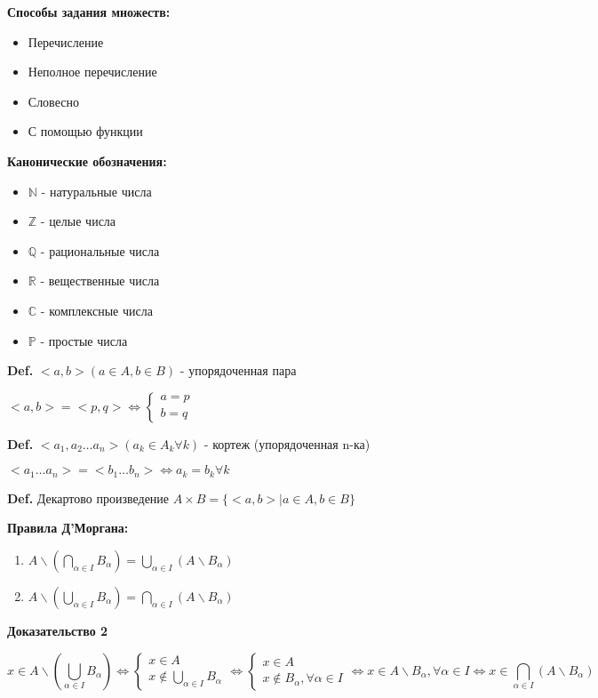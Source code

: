\documentclass[14pt, letter paper]{article}
\begin{document}
\textbf{Способы задания множеств:}
\begin{itemize}
    \item Перечисление
    \item Неполное перечисление
    \item Словесно
    \item С помощью функции
\end{itemize}

\textbf{Канонические обозначения:}
\begin{itemize}
    \item $\mathds{N}$ - натуральные числа
    \item $\mathds{Z}$ - целые числа
    \item $\mathds{Q}$ - рациональные числа
    \item $\mathds{R}$ - вещественные числа
    \item $\mathds{C}$ - комплексные числа
    \item $\mathds{P}$ - простые числа
\end{itemize}

\textbf{Def.} $<a, b> (a \in A, b \in B)$ - упорядоченная пара \par $<a, b> = <p, q> \Leftrightarrow \begin{cases} a = p \\ b = q \end{cases}$

\textbf{Def.} $<a_1, a_2 \ldots a_n> (a_k \in A_k \forall k)$ - кортеж (упорядоченная n-ка)\par $<a_1 \ldots a_n> = <b_1 \ldots b_n> \Leftrightarrow a_k = b_k \forall k$

\textbf{Def.} Декартово произведение $A \times B = \{ <a, b> | a \in A, b \in B\}$

\textbf{Правила Д'Моргана:}
\begin{enumerate}
    \item $A \backslash (\bigcap\limits_{\alpha \in I} B_\alpha) = \bigcup\limits_{\alpha \in I} (A \backslash B_\alpha)$
    \item $A \backslash (\bigcup\limits_{\alpha \in I} B_\alpha) = \bigcap\limits_{\alpha \in I} (A \backslash B_\alpha)$
\end{enumerate}

\begin{center} \textbf{Доказательство 2} \end{center}
\[x \in A \backslash (\bigcup\limits_{\alpha \in I} B_\alpha) \Leftrightarrow \begin{cases} x \in A \\ x \notin \bigcup\limits_{\alpha \in I} B_\alpha \end{cases} \Leftrightarrow \begin{cases} x \in A \\ x \notin B_\alpha, \forall \alpha \in I \end{cases} \Leftrightarrow x \in A \backslash B_\alpha, \forall \alpha \in I \Leftrightarrow x \in \bigcap\limits_{\alpha \in I} (A \backslash B_\alpha)\]
\end{document}
